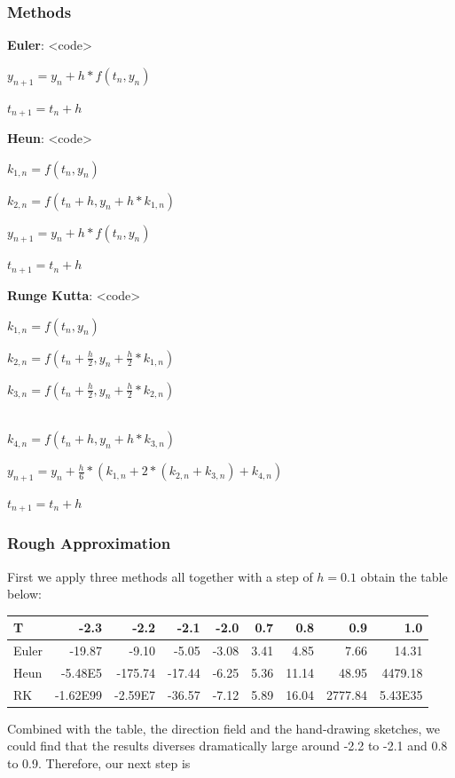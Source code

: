 \documentclass[cap,cs5size,nospace,indent,fancyhdr]{ctexart}
\begin{document}
\subsubsection{Methods}
\begin{multicols}{2}	
	\textbf{Euler}: <code>
	
	$ y_{n+1} = y_n+h*f(t_n, y_n)$
	
	$ t_{n+1} = t_n+h$
	
	\vfill\null
	\columnbreak

	\textbf{Heun}: <code>
	
	$ k_{1,n} = f(t_n,y_n)$
	
	$ k_{2,n} = f(t_n+h, y_n+h*k_{1,n})$
	
	$ y_{n+1} = y_n+h*f(t_n, y_n)$
	
	$ t_{n+1} = t_n+h$
	

	\textbf{Runge Kutta}: <code>
	
	$ k_{1,n} = f(t_n,y_n)$
	
	$ k_{2,n} = f(t_n+\frac{h}{2}, y_n+\frac{h}{2}*k_{1,n})$

	$ k_{3,n} = f(t_n+\frac{h}{2}, y_n+\frac{h}{2}*k_{2,n})$

	~\\

	$ k_{4,n} = f(t_n+h, y_n+h*k_{3,n})$
	
	$ y_{n+1} = y_n+\frac{h}{6}*(k_{1,n}+2*(k_{2,n}+k_{3,n})+k_{4,n})$
	
	$ t_{n+1} = t_n+h$

	\vfill\null
	\columnbreak
\end{multicols}

\subsubsection{Rough Approximation}
\noindent First we apply three methods all together with a step of $h = 0.1$ obtain the table below:
\begin{table}[!htb]
	\begin{center}
		\begin{tabular}{l|r|r|r|r|r|r|r|r}
			\textbf{T} & \textbf{-2.3} & \textbf{-2.2} &\textbf{-2.1} & \textbf{-2.0} & \textbf{0.7} & \textbf{0.8} & \textbf{0.9} & \textbf{1.0}  \\
			\hline
			Euler & -19.87 & -9.10 & -5.05 & -3.08 & 3.41 & 4.85 & 7.66 & 14.31\\	
			\hline
			Heun  &-5.48E5&-175.74&-17.44 & -6.25 & 5.36 & 11.14 & 48.95 & 4479.18\\
			\hline
			RK & -1.62E99 & -2.59E7 & -36.57 & -7.12 & 5.89 & 16.04 & 2777.84 & 5.43E35\\
		\end{tabular}
	\end{center}
\end{table}

Combined with the table, the direction field and the hand-drawing sketches, we could find that the results diverses dramatically large around -2.2 to -2.1 and 0.8 to 0.9. Therefore, our next step is 
\end{document}
